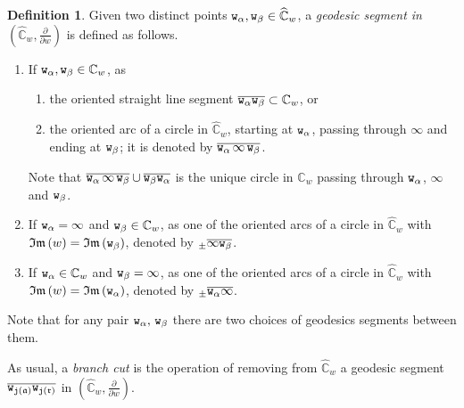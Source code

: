 \documentclass[final,3p,times]{elsarticle}
\newcommand{\CC}{\ensuremath{{\mathbb C}}}
\newcommand{\CW}{\ensuremath{{\widehat{\mathbb C}}}}
\renewcommand{\Im}[1]{{\mathfrak{Im}\left(#1\right)}}
\newcommand{\del}[2]{\frac{\partial #1}{\partial #2}}
\newcommand{\msigma}{\ensuremath{{\mathfrak{a}}}}
\newcommand{\mrho}{\ensuremath{{\mathfrak{r}}}}
\theoremstyle{definition}
\newtheorem{definition}[theorem]{Definition}
\begin{document}
\begin{definition}
\label{def:geodesic-segments}
Given two distinct points ${\tt w}_\alpha, {\tt w}_\beta \in \CW_w$, 
a \emph{geodesic segment  
in $(\CW_w, \del{}{w})$} is defined as follows.

\begin{enumerate}[label=\arabic*),leftmargin=*] 
\item 
If ${\tt w}_\alpha, {\tt w}_\beta \in \CC_w$, as
\begin{enumerate}[label=\roman*),leftmargin=*]

\item 
the oriented straight line segment $\overline{{\tt w}_\alpha {\tt w}_\beta} \subset \CC_w$, 
or 

\item
the oriented arc of a circle in $\CW_w$, 
starting at ${\tt w}_\alpha$, 
passing through $\infty$ and 
ending at ${\tt w}_\beta$;
it is denoted
by $\overline{{\tt w}_\alpha\, \infty\, {\tt w}_\beta}$.
\end{enumerate}

\noindent
Note that 
$\overline{{\tt w}_\alpha\, \infty\,  {\tt w}_\beta}
\cup \overline{{\tt w}_\beta {\tt w}_\alpha} $
is the unique circle in $\CW_w$ passing through 
${\tt w}_\alpha$, $\infty$ and ${\tt w}_\beta$.

\item
If ${\tt w}_\alpha = \infty$ and ${\tt w}_\beta \in\CC_w$, as 
one of 
the oriented arcs of a circle in $\CW_w$ with $\Im{w}=\Im{{\tt w}_\beta}$,
denoted by ${}_{\pm}\overline{\infty {\tt w}_\beta}$.

\item
If ${\tt w}_\alpha \in \CC_w$ and ${\tt w}_\beta = \infty$, as 
one of 
the oriented arcs of a circle in $\CW_w$ with 
$\Im{w}=\Im{{\tt w}_\alpha}$, 
denoted by ${}_{\pm}\overline{ {\tt w}_\alpha \infty}$.
\end{enumerate}
\end{definition}

Note that for any pair
${\tt w}_{\alpha}, \, {\tt w}_{\beta}$  
there are two choices of geodesics segments between them.

As usual, a \emph{branch cut}
is the operation of removing from $\CW_w$ 
a geodesic segment 
$\overline{ {\tt w}_{{\tt j}( \msigma )} 
{\tt w}_{{\tt j}( \mrho )} }$ in $(\CW_w, \del{}{w})$. 
\end{document}
